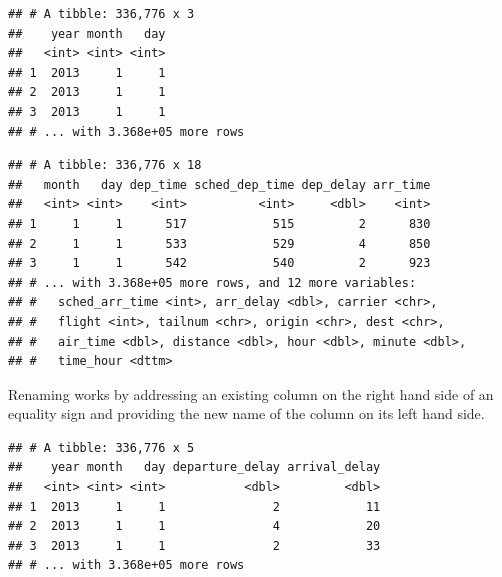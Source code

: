 \documentclass[]{book}
\newenvironment{Shaded}{}{}
\newcommand{\DataTypeTok}[1]{#1}
\newcommand{\KeywordTok}[1]{\textcolor[rgb]{0.00,0.00,1.00}{#1}}
\newcommand{\NormalTok}[1]{#1}
\newcommand{\OperatorTok}[1]{#1}
\newcommand{\StringTok}[1]{\textcolor[rgb]{0.00,0.50,0.50}{#1}}
\begin{document}
\begin{verbatim}
## # A tibble: 336,776 x 3
##    year month   day
##   <int> <int> <int>
## 1  2013     1     1
## 2  2013     1     1
## 3  2013     1     1
## # ... with 3.368e+05 more rows
\end{verbatim}

\begin{Shaded}
\end{Shaded}

\begin{verbatim}
## # A tibble: 336,776 x 18
##   month   day dep_time sched_dep_time dep_delay arr_time
##   <int> <int>    <int>          <int>     <dbl>    <int>
## 1     1     1      517            515         2      830
## 2     1     1      533            529         4      850
## 3     1     1      542            540         2      923
## # ... with 3.368e+05 more rows, and 12 more variables:
## #   sched_arr_time <int>, arr_delay <dbl>, carrier <chr>,
## #   flight <int>, tailnum <chr>, origin <chr>, dest <chr>,
## #   air_time <dbl>, distance <dbl>, hour <dbl>, minute <dbl>,
## #   time_hour <dttm>
\end{verbatim}

Renaming works by addressing an existing column on the right hand side of an equality sign and providing the new name of the column on its left hand side.

\begin{Shaded}
\end{Shaded}

\begin{verbatim}
## # A tibble: 336,776 x 5
##    year month   day departure_delay arrival_delay
##   <int> <int> <int>           <dbl>         <dbl>
## 1  2013     1     1               2            11
## 2  2013     1     1               4            20
## 3  2013     1     1               2            33
## # ... with 3.368e+05 more rows
\end{verbatim}
\end{document}
